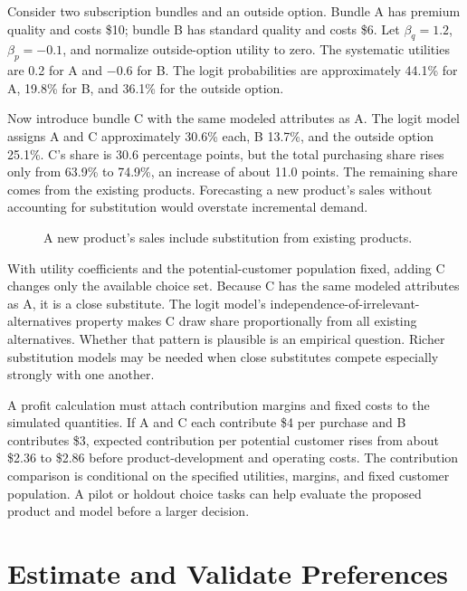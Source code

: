 \noindent Consider two subscription bundles and an outside option. Bundle A has
premium quality and costs \$10; bundle B has standard quality and costs
\$6. Let \(\beta_q=1.2\), \(\beta_p=-0.1\), and normalize outside-option
utility to zero. The systematic utilities are 0.2 for A and \(-0.6\) for
B. The logit probabilities are approximately 44.1\% for A, 19.8\% for B,
and 36.1\% for the outside option.

Now introduce bundle C with the same modeled attributes as A. The logit
model assigns A and C approximately 30.6\% each, B 13.7\%, and the
outside option 25.1\%. C's share is 30.6 percentage points, but the
total purchasing share rises only from 63.9\% to 74.9\%, an increase of
about 11.0 points. The remaining share comes from the existing products.
Forecasting a new product's sales without accounting for substitution
would overstate incremental demand.

\begin{figure}[htbp]
\centering

\caption{A new product’s sales include substitution from existing products.}\label{fig:M04_cannibalization}
\end{figure}

With utility coefficients and the potential-customer population fixed,
adding C changes only the available choice set. Because C has the same
modeled attributes as A, it is a close substitute. The logit model's
independence-of-irrelevant-alternatives property makes C draw share
proportionally from all existing alternatives. Whether that pattern is
plausible is an empirical question. Richer substitution models may be
needed when close substitutes compete especially strongly with one
another.

A profit calculation must attach contribution margins and fixed costs to
the simulated quantities. If A and C each contribute \$4 per purchase
and B contributes \$3, expected contribution per potential customer
rises from about \$2.36 to \$2.86 before product-development and
operating costs. The contribution comparison is conditional on the
specified utilities, margins, and fixed customer population. A pilot or
holdout choice tasks can help evaluate the proposed product and model
before a larger decision.

\hypertarget{M04-estimate-and-validate-preferences}{%
\section{Estimate and Validate
Preferences}\label{M04-estimate-and-validate-preferences}}


